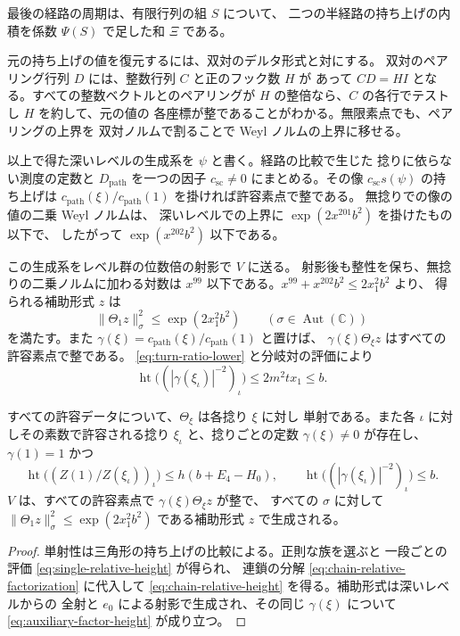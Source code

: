 最後の経路の周期は、有限行列の組 \(S\) について、
二つの半経路の持ち上げの内積を係数 \(\Psi(S)\) で足した和 \(\Xi\) である。


元の持ち上げの値を復元するには、双対のデルタ形式と対にする。
双対のペアリング行列 \(D\) には、整数行列 \(C\) と正のフック数 \(H\) が
あって \(CD=HI\) となる。すべての整数ベクトルとのペアリングが
\(H\) の整倍なら、\(C\) の各行でテストし \(H\) を約して、元の値の
各座標が整であることがわかる。無限素点でも、ペアリングの上界を
双対ノルムで割ることで Weyl ノルムの上界に移せる。

以上で得た深いレベルの生成系を \(\psi\) と書く。経路の比較で生じた
捻りに依らない測度の定数と \(D_\mathrm{path}\) を一つの因子
\(c_{\mathrm{sc}}\ne 0\) にまとめる。その像 \(c_{\mathrm{sc}}s(\psi)\) の持ち上げは
\(c_{\mathrm{path}}(\xi)/c_{\mathrm{path}}(1)\) を掛ければ許容素点で整である。
無捻りでの像の値の二乗 Weyl ノルムは、
深いレベルでの上界に \(\exp(2x^{201}b^2)\) を掛けたもの以下で、
したがって \(\exp(x^{202}b^2)\) 以下である。

この生成系をレベル群の位数倍の射影で \(V\) に送る。
射影後も整性を保ち、無捻りの二乗ノルムに加わる対数は
\(x^{99}\) 以下である。\(x^{99}+x^{202}b^2\le 2x_1^2b^2\) より、
得られる補助形式 \(z\) は
\[
 \|\Theta_1 z\|_\sigma^2\le \exp(2x_1^2b^2)
 \qquad(\sigma\in\operatorname{Aut}(\mathbb C))
\]
を満たす。また \(\gamma(\xi)=c_{\mathrm{path}}(\xi)/c_{\mathrm{path}}(1)\) と置けば、
\(\gamma(\xi)\Theta_\xi z\) はすべての許容素点で整である。
\eqref{eq:turn-ratio-lower} と分岐対の評価により
\begin{equation}
 \operatorname{ht}\bigl((|\gamma(\xi_\iota)|^{-2})_\iota\bigr)
 \le 2m^2t x_1\le b .
 \label{eq:auxiliary-factor-height}
\end{equation}

\begin{proposition}\label{prop:determinant-inputs}
すべての許容データについて、\(\Theta_\xi\) は各捻り \(\xi\) に対し
単射である。また各 \(\iota\) に対しその素数で許容される捻り
\(\xi_\iota\) と、捻りごとの定数 \(\gamma(\xi)\ne0\) が存在し、
\(\gamma(1)=1\) かつ
\[
 \operatorname{ht}\bigl((Z(1)/Z(\xi_\iota))_\iota\bigr)
       \le h(b+E_4-H_0),\qquad
 \operatorname{ht}\bigl((|\gamma(\xi_\iota)|^{-2})_\iota\bigr)\le b.
\]
\(V\) は、すべての許容素点で \(\gamma(\xi)\Theta_\xi z\) が整で、
すべての \(\sigma\) に対して
\(\|\Theta_1 z\|_\sigma^2\le\exp(2x_1^2b^2)\) である補助形式 \(z\)
で生成される。
\end{proposition}
\begin{proof}
単射性は三角形の持ち上げの比較による。正則な族を選ぶと
一段ごとの評価 \eqref{eq:single-relative-height} が得られ、
連鎖の分解 \eqref{eq:chain-relative-factorization} に代入して
\eqref{eq:chain-relative-height} を得る。補助形式は深いレベルからの
全射と \(e_0\) による射影で生成され、その同じ \(\gamma(\xi)\) について
\eqref{eq:auxiliary-factor-height} が成り立つ。
\end{proof}
